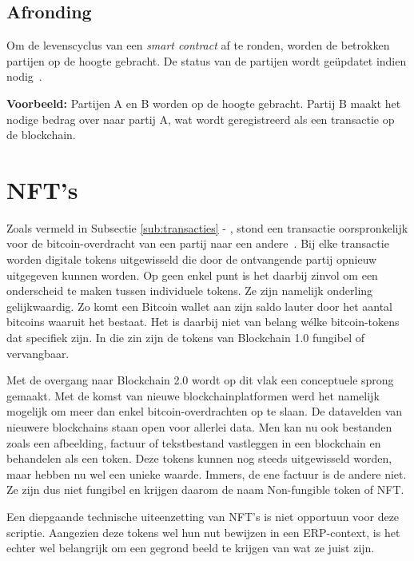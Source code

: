 \subsection{Afronding}

Om de levenscyclus van een \textit{smart contract} af te ronden, worden de betrokken partijen op de hoogte gebracht. De status van de partijen wordt geüpdatet indien nodig~\autocite{Zheng2019}.

\textbf{Voorbeeld:}
Partijen A en B worden op de hoogte gebracht. Partij B maakt het nodige bedrag over naar partij A, wat wordt geregistreerd als een transactie op de blockchain.



\section{NFT's}

Zoals vermeld in Subsectie \ref{sub:transacties} - , stond een transactie oorspronkelijk voor de bitcoin-overdracht van een partij naar een andere~\autocite{Pierro2017}. Bij elke transactie worden digitale tokens uitgewisseld die door de ontvangende partij opnieuw uitgegeven kunnen worden. Op geen enkel punt is het daarbij zinvol om een onderscheid te maken tussen individuele tokens. Ze zijn namelijk onderling gelijkwaardig. Zo komt een Bitcoin wallet aan zijn saldo lauter door het aantal bitcoins waaruit het bestaat. Het is daarbij niet van belang wélke bitcoin-tokens dat specifiek zijn. In die zin zijn de tokens van Blockchain 1.0 fungibel of vervangbaar.

Met de overgang naar Blockchain 2.0 wordt op dit vlak een conceptuele sprong gemaakt. Met de komst van nieuwe blockchainplatformen werd het namelijk mogelijk om meer dan enkel bitcoin-overdrachten op te slaan. De datavelden van nieuwere blockchains staan open voor allerlei data. Men kan nu ook bestanden zoals een afbeelding, factuur of tekstbestand vastleggen in een blockchain en behandelen als een token. Deze tokens kunnen nog steeds uitgewisseld worden, maar hebben nu wel een unieke waarde. Immers, de ene factuur is de andere niet. Ze zijn dus niet fungibel en krijgen daarom de naam Non-fungible token of NFT.

Een diepgaande technische uiteenzetting van NFT's is niet opportuun voor deze scriptie. Aangezien deze tokens wel hun nut bewijzen in een ERP-context, is het echter wel belangrijk om een gegrond beeld te krijgen van wat ze juist zijn.

